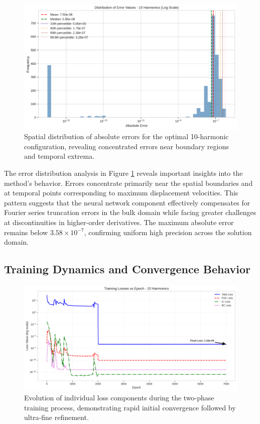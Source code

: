 \begin{figure}[ht]
    \centering
    \includegraphics[width = 1.0\linewidth]{figures/error_distribution_10h.png}
    \caption{Spatial distribution of absolute errors for the optimal 10-harmonic configuration, revealing concentrated errors near boundary regions and temporal extrema.}
    \label{fig:error_dist}
\end{figure}

The error distribution analysis in Figure \ref{fig:error_dist} reveals important insights into the method's behavior. Errors concentrate primarily near the spatial boundaries and at temporal points corresponding to maximum displacement velocities. This pattern suggests that the neural network component effectively compensates for Fourier series truncation errors in the bulk domain while facing greater challenges at discontinuities in higher-order derivatives. The maximum absolute error remains below $3.58 \times 10^{-7}$, confirming uniform high precision across the solution domain.

\subsection{Training Dynamics and Convergence Behavior}

\begin{figure}[ht]
    \centering
    \includegraphics[width = 1.0\linewidth]{figures/training_losses_10h.png}
    \caption{Evolution of individual loss components during the two-phase training process, demonstrating rapid initial convergence followed by ultra-fine refinement.}
    \label{fig:training_losses}
\end{figure}

